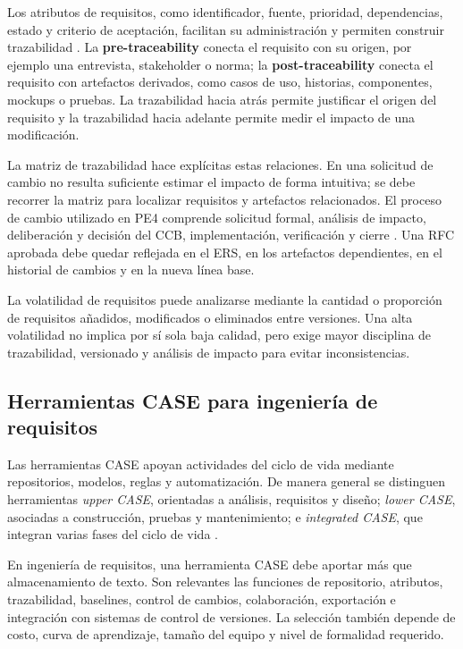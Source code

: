 \documentclass[12pt,a4paper]{article}
\begin{document}
Los atributos de requisitos, como identificador, fuente, prioridad, dependencias, estado y criterio de aceptación, facilitan su administración y permiten construir trazabilidad \cite{r5}. La \textbf{pre-traceability} conecta el requisito con su origen, por ejemplo una entrevista, stakeholder o norma; la \textbf{post-traceability} conecta el requisito con artefactos derivados, como casos de uso, historias, componentes, mockups o pruebas. La trazabilidad hacia atrás permite justificar el origen del requisito y la trazabilidad hacia adelante permite medir el impacto de una modificación.

La matriz de trazabilidad hace explícitas estas relaciones. En una solicitud de cambio no resulta suficiente estimar el impacto de forma intuitiva; se debe recorrer la matriz para localizar requisitos y artefactos relacionados. El proceso de cambio utilizado en PE4 comprende solicitud formal, análisis de impacto, deliberación y decisión del CCB, implementación, verificación y cierre \cite{r7,r5}. Una RFC aprobada debe quedar reflejada en el ERS, en los artefactos dependientes, en el historial de cambios y en la nueva línea base.

La volatilidad de requisitos puede analizarse mediante la cantidad o proporción de requisitos añadidos, modificados o eliminados entre versiones. Una alta volatilidad no implica por sí sola baja calidad, pero exige mayor disciplina de trazabilidad, versionado y análisis de impacto para evitar inconsistencias.

\subsection{Herramientas CASE para ingeniería de requisitos}

Las herramientas CASE apoyan actividades del ciclo de vida mediante repositorios, modelos, reglas y automatización. De manera general se distinguen herramientas \textit{upper CASE}, orientadas a análisis, requisitos y diseño; \textit{lower CASE}, asociadas a construcción, pruebas y mantenimiento; e \textit{integrated CASE}, que integran varias fases del ciclo de vida \cite{r6,r5}.

En ingeniería de requisitos, una herramienta CASE debe aportar más que almacenamiento de texto. Son relevantes las funciones de repositorio, atributos, trazabilidad, baselines, control de cambios, colaboración, exportación e integración con sistemas de control de versiones. La selección también depende de costo, curva de aprendizaje, tamaño del equipo y nivel de formalidad requerido.
\end{document}
